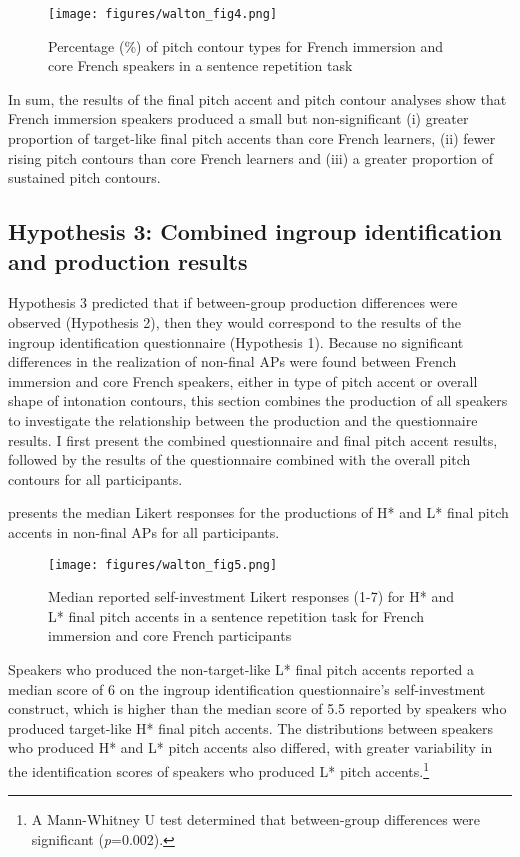\documentclass[output=paper,colorlinks,citecolor=brown,draftmode]{langscibook}
\begin{document}
\begin{figure}
    \texttt{[image: figures/walton\_fig4.png]}
    \caption{Percentage (\%) of pitch contour types for French immersion and core French speakers in a sentence repetition task}
    \label{Pitch Contour.Program}
\end{figure}

In sum, the results of the final pitch accent and pitch contour analyses show that French immersion speakers produced a small but non-significant (i) greater proportion of target-like final pitch accents than core French learners, (ii) fewer rising pitch contours than core French learners and (iii) a greater proportion of sustained pitch contours.

\subsection{Hypothesis 3: Combined ingroup identification and production results}

Hypothesis 3 predicted that if between-group production differences were observed (Hypothesis 2), then they would correspond to the results of the ingroup identification questionnaire (Hypothesis 1). Because no significant differences in the realization of non-final APs were found between French immersion and core French speakers, either in type of pitch accent or overall shape of intonation contours, this section combines the production of all speakers to investigate the relationship between the production and the questionnaire results. I first present the combined questionnaire and final pitch accent results, followed by the results of the questionnaire combined with the overall pitch contours for all participants.


 presents the median Likert responses for the productions of H* and L* final pitch accents in non-final APs for all participants.

\begin{figure}
    \texttt{[image: figures/walton\_fig5.png]}
    \caption{Median reported self-investment Likert responses (1-7) for H* and L* final pitch accents in a sentence repetition task for French immersion and core French participants }
    \label{SI.Pitch Accent}
\end{figure}

\noindent Speakers who produced the non-target-like L* final pitch accents reported a median score of 6 on the ingroup identification questionnaire’s self-investment construct, which is higher than the median score of 5.5 reported by speakers who produced target-like H* final pitch accents. The distributions between speakers who produced H* and L* pitch accents also differed, with greater variability in the identification scores of speakers who produced L* pitch accents.\footnote{A Mann-Whitney U test determined that between-group differences were significant (\textit{p}=0.002).}
\end{document}
